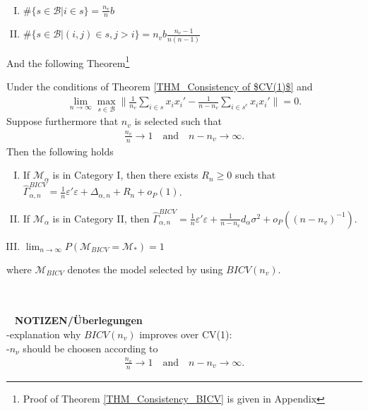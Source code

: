 \documentclass[Research_Module_ES.tex]{subfiles}
\begin{document}
\begin{claim}~
	\label{Claim_BICV}
	\begin{enumerate}[(I)]
	\item $\#\{s\in \mathcal{B}| i\in s\} = \frac{n_v}{n} b$ 
	\item $\#\{s\in\mathcal{B}|(i,j)\in s, j>i\}=n_vb\frac{n_v-1}{n(n-1)}$
	\end{enumerate}
\end{claim}
And the following Theorem\footnote{Proof of Theorem \ref{THM_Consistency_BICV} is given in Appendix }
\begin{thm}
	\label{THM_Consistency_BICV}
Under the conditions of Theorem \ref{THM_Consistency of $CV(1)$} and
\begin{align*}
\lim_{n\to\infty} \max_{s\in \mathcal{B}}\biggl\lVert \frac{1}{n_v}\sum_{i\in s}x_ix_i' - \frac{1}{n-n_v}\sum_{i\in s^c}x_ix_i'\biggr\rVert =0.
\end{align*}
Suppose furthermore that $n_v$ is selected such that
\begin{align*}
\frac{n_v}{n}\to 1 \quad \textrm{and} \quad n-n_v \to \infty.
\end{align*}
Then the following holds
\begin{enumerate}[(I)]
\item If $\mathcal{M}_\alpha$ is in Category I, then there exists $R_n \ge 0$ such that $\hat{\Gamma}_{\alpha,n}^{BICV} = \frac{1}{n}\varepsilon'\varepsilon + \Delta_{\alpha,n} + R_n + o_P(1)$.
\item If $\mathcal{M}_\alpha$ is in Category II, then $\hat{\Gamma}_{\alpha,n}^{BICV} = \frac{1}{n}\varepsilon'\varepsilon + \frac{1}{n-n_v}d_\alpha\sigma^2  + o_P((n-n_v)^{-1})$.
\item $\lim_{n\to\infty}P(\mathcal{M}_{BICV}=\mathcal{M}_\ast) = 1$
\end{enumerate}
where $\mathcal{M}_{BICV}$ denotes the model selected by using $BICV(n_v)$.
\end{thm}
~
\\\\
~
\textbf{NOTIZEN/Überlegungen}\\
-explanation why $BICV(n_v)$ improves over CV(1):\\
-$n_\nu$ should be choosen according to\\ \begin{align*}
\frac{n_v}{n}\to 1 \quad \textrm{and} \quad n-n_v \to \infty.
\end{align*}
\end{document}

